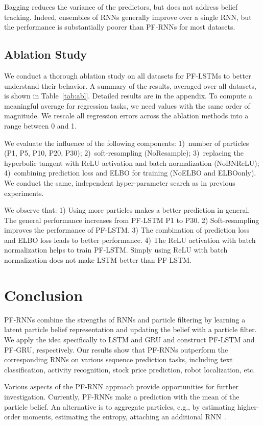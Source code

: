 \documentclass[letterpaper]{article} %
\begin{document}
Bagging reduces the variance of the predictors, but does not address belief tracking. 
Indeed, ensembles of RNNs generally improve over a single RNN, but the performance is substantially poorer than PF-RNNs for most datasets.

\subsection{Ablation Study}

We conduct a thorough ablation study on all datasets for PF-LSTMs to better understand their behavior. 
A summary of the results, averaged over all datasets, is shown in Table~\ref{tab:abl}. Detailed results are in the appendix. To compute a meaningful average for regression tasks, we need values with the same order of magnitude. We rescale all regression errors across the ablation methods into a range between 0 and 1.

We evaluate the influence of the following components: 1)~number of particles (P1, P5, P10, P20, P30); 
2)~soft-resampling (NoResample); 3)~replacing the hyperbolic tangent with ReLU activation and batch normalization (NoBNReLU); 4)~combining prediction loss and ELBO for training (NoELBO and ELBOonly). We conduct the same, independent hyper-parameter search as in previous experiments.

We observe that: 1) Using more particles makes a better prediction in general. The general performance increases from PF-LSTM P1 to P30. 
2) Soft-resampling improves the performance of PF-LSTM. 3) The combination of prediction loss and ELBO loss leads to better performance. 4) The ReLU activation with batch normalization helps to train PF-LSTM. Simply using ReLU with batch normalization does not make LSTM better than PF-LSTM.

\section{Conclusion}

PF-RNNs combine the strengths of RNNs and particle filtering by learning a latent particle belief representation and updating the belief with a particle filter. %
We apply the idea specifically to LSTM and GRU and construct PF-LSTM and PF-GRU, respectively. Our results show that PF-RNNs outperform the corresponding RNNs  on various sequence prediction tasks, including text classification, activity recognition, stock price prediction, robot localization, etc. %

Various aspects of the PF-RNN approach provide opportunities for further investigation. Currently, PF-RNNs make a prediction with the mean of the particle belief. An alternative is to  aggregate particles, e.g., by estimating higher-order moments, estimating
the entropy, attaching an additional RNN~\cite{igl2018deep}.
\end{document}
